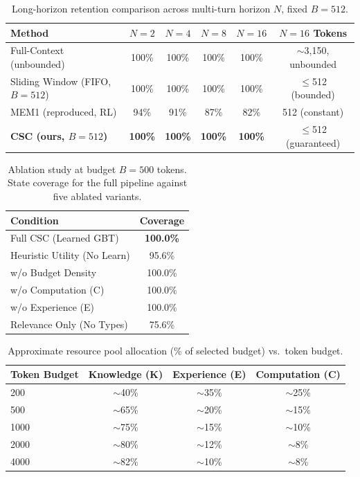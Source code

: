 \documentclass{article}
\begin{document}
\begin{table}[h]
\caption{Long-horizon retention comparison across multi-turn horizon $N$, fixed $B=512$.}
\centering
\begin{tabular}{lccccc}
\toprule
Method & $N=2$ & $N=4$ & $N=8$ & $N=16$ & $N=16$ Tokens \\
\midrule
Full-Context (unbounded) & 100\% & 100\% & 100\% & 100\% & $\sim$3,150, unbounded \\
Sliding Window (FIFO, $B{=}512$) & 100\% & 100\% & 100\% & 100\% & $\leq$512 (bounded) \\
MEM1 (reproduced, RL) & 94\% & 91\% & 87\% & 82\% & 512 (constant) \\
\textbf{CSC (ours, $B{=}512$)} & \textbf{100\%} & \textbf{100\%} & \textbf{100\%} & \textbf{100\%} & $\leq$512 (guaranteed) \\
\bottomrule
\end{tabular}
\end{table}

\begin{table}[h]
\caption{Ablation study at budget $B=500$ tokens. State coverage for the full pipeline against five ablated variants.}
\centering
\begin{tabular}{lc}
\toprule
Condition & Coverage \\
\midrule
Full CSC (Learned GBT) & \textbf{100.0\%} \\
Heuristic Utility (No Learn) & 95.6\% \\
w/o Budget Density & 100.0\% \\
w/o Computation (C) & 100.0\% \\
w/o Experience (E) & 100.0\% \\
Relevance Only (No Types) & 75.6\% \\
\bottomrule
\end{tabular}
\end{table}

\begin{table}[h]
\caption{Approximate resource pool allocation (\% of selected budget) vs.\ token budget.}
\centering
\begin{tabular}{lccc}
\toprule
Token Budget & Knowledge (K) & Experience (E) & Computation (C) \\
\midrule
200 & $\sim$40\% & $\sim$35\% & $\sim$25\% \\
500 & $\sim$65\% & $\sim$20\% & $\sim$15\% \\
1000 & $\sim$75\% & $\sim$15\% & $\sim$10\% \\
2000 & $\sim$80\% & $\sim$12\% & $\sim$8\% \\
4000 & $\sim$82\% & $\sim$10\% & $\sim$8\% \\
\bottomrule
\end{tabular}
\end{table}


\end{document}
